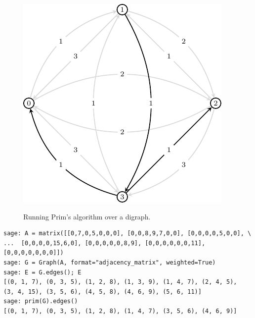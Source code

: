 \begin{figure}[!htbp]
{  \includegraphics{image/trees-forests/Prim-algorithm-digraph_second}
}
\qquad
{}
\caption{Running Prim's algorithm over a digraph.}
\label{fig:tree_forests:Prim_algorithm_digraph}
\end{figure}

\begin{lstlisting}
sage: A = matrix([[0,7,0,5,0,0,0], [0,0,8,9,7,0,0], [0,0,0,0,5,0,0], \
...  [0,0,0,0,15,6,0], [0,0,0,0,0,8,9], [0,0,0,0,0,0,11], [0,0,0,0,0,0,0]])
sage: G = Graph(A, format="adjacency_matrix", weighted=True)
sage: E = G.edges(); E
[(0, 1, 7), (0, 3, 5), (1, 2, 8), (1, 3, 9), (1, 4, 7), (2, 4, 5),
(3, 4, 15), (3, 5, 6), (4, 5, 8), (4, 6, 9), (5, 6, 11)]
sage: prim(G).edges()
[(0, 1, 7), (0, 3, 5), (1, 2, 8), (1, 4, 7), (3, 5, 6), (4, 6, 9)]
\end{lstlisting}

